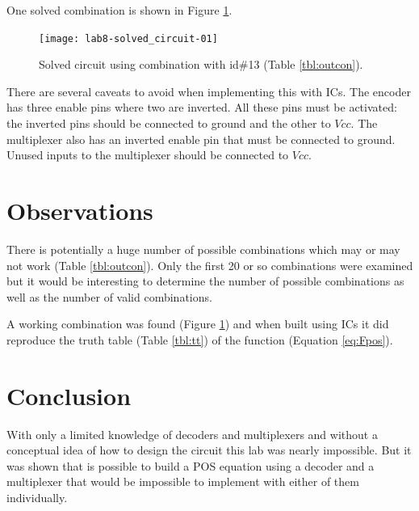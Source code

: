 \documentclass[12pt]{article}
\begin{document}
One solved combination is shown in Figure \ref{fig:solved}.

\begin{figure}[htbp]
\center
\texttt{[image: lab8-solved\_circuit-01]}
\caption{Solved circuit using combination with id\#13 (Table \ref{tbl:outcon}).}
\label{fig:solved}
\end{figure}

\samepage
There are several caveats to avoid when implementing this with ICs.
The encoder has three enable pins where two are inverted.
All these pins must be activated: the inverted pins should be connected
to ground and the other to $Vcc$.
The multiplexer also has an inverted enable pin that must be connected to ground.
Unused inputs to the multiplexer should be connected to $Vcc$.

\clearpage


\section{Observations}

There is potentially a huge number of possible combinations which
may or may not work (Table \ref{tbl:outcon}).
Only the first 20 or so combinations were examined but it would be
interesting to determine the number of possible combinations as well
as the number of valid combinations.

A working combination was found (Figure \ref{fig:solved}) and when
built using ICs it did reproduce the truth table (Table \ref{tbl:tt})
of the function (Equation \ref{eq:Fpos}).


\section{Conclusion}

With only a limited knowledge of decoders and multiplexers and without
a conceptual idea of how to design the circuit this lab was nearly
impossible.
But it was shown that is possible to build a POS equation using a decoder
and a multiplexer that would be impossible to implement with either of them
individually.


%
%
\end{document}
